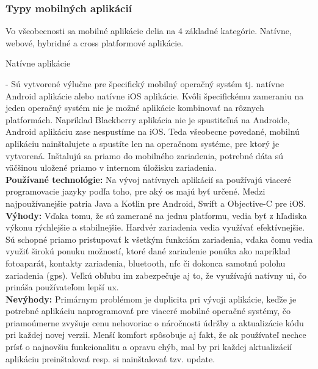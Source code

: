 \subsubsection{Typy mobilných aplikácií}
\label{sec:typy aplikacii}
Vo všeobecnosti sa mobilné aplikácie delia na 4 základné kategórie. Natívne, webové, hybridné a cross platformové aplikácie.
\begin{itemize}[leftmargin=*]
{\bf \item Natívne aplikácie} - Sú vytvorené výlučne pre špecifický mobilný operačný systém tj. natívne Android aplikácie alebo natívne iOS aplikácie. Kvôli špecifickému zameraniu na jeden operačný systém nie je možné aplikácie kombinovať na rôznych platformách. Napríklad Blackberry aplikácia nie je spustiteľná na Androide, Android aplikáciu zase nespustíme na iOS. Teda všeobecne povedané, mobilnú aplikáciu nainštalujete a spustíte len na operačnom systéme, pre ktorý je vytvorená. Inštalujú sa priamo do mobilného zariadenia, potrebné dáta sú väčšinou uložené priamo v internom úložisku zariadenia. \cite{ma3} \\

{\bf Používané technológie:} Na vývoj natívnych aplikácií sa používajú viaceré programovacie jazyky podľa toho, pre aký \acrshort{os} majú byť určené. Medzi najpoužívanejšie patria Java a Kotlin pre Android, Swift a Objective-C pre iOS. \\

{\bf Výhody:} Vďaka tomu, že sú zamerané na jednu platformu, vedia byť z hľadiska výkonu rýchlejšie a stabilnejšie. Hardvér zariadenia vedia využívať efektívnejšie. Sú schopné priamo pristupovať k všetkým funkciám zariadenia, vďaka čomu vedia využiť širokú ponuku možností, ktoré dané zariadenie ponúka ako napríklad fotoaparát, kontakty zariadenia, bluetooth, \acrshort{nfc} či dokonca samotnú polohu zariadenia (\acrshort{gps}). Veľkú obľubu im zabezpečuje aj to, že využívajú natívny \acrshort{ui}, čo prináša používateľom lepší \acrshort{ux}. \cite{ma3} \\
 
{\bf Nevýhody:} Primárnym problémom je duplicita pri vývoji aplikácie, keďže je potrebné aplikáciu naprogramovať pre viaceré mobilné operačné systémy, čo priamoúmerne zvyšuje cenu nehovoriac o náročnosti údržby a aktualizácie kódu pri každej novej verzii. Menší komfort spôsobuje aj fakt, že ak používateľ nechce prísť o najnovšiu funkcionalitu a opravu chýb, mal by pri každej aktualizácií aplikáciu preinštalovať resp. si nainštalovať tzv. update. \cite{ma3} \\


\end{itemize}
